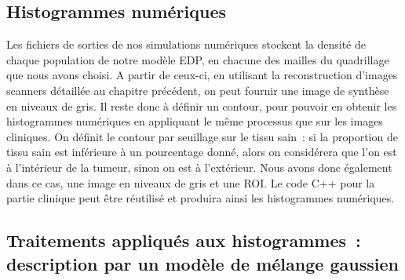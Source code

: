 \documentclass[main.tex]{subfiles}
\begin{document}
\subsection{Histogrammes numériques}
Les fichiers de sorties de nos simulations numériques stockent la densité de chaque population de notre modèle EDP, en chacune des mailles du quadrillage que nous avons choisi. 
A partir de ceux-ci, en utilisant la reconstruction d'images scanners détaillée au chapitre précédent, on peut fournir une image de synthèse en niveaux de gris. 
Il reste donc à définir un contour, pour pouvoir en obtenir les histogrammes numériques en appliquant le même processus que sur les images cliniques. 
On définit le contour par seuillage sur le tissu sain~: 
si la proportion de tissu sain est inférieure à un pourcentage donné, alors on considérera que l'on est à l'intérieur de la tumeur, sinon on est à l'extérieur. 
Nous avons donc également dans ce cas, une image en niveaux de gris et une ROI. Le code C++ pour la partie clinique peut être réutilisé et produira ainsi les histogrammes numériques.

\subsection{Traitements appliqués aux histogrammes~: description par un modèle de mélange  gaussien}
\end{document}

